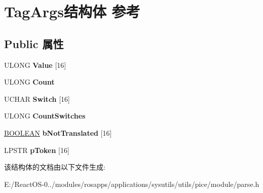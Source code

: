 \hypertarget{struct_tag_args}{}\section{Tag\+Args结构体 参考}
\label{struct_tag_args}
\subsection*{Public 属性}
\begin{DoxyCompactItemize}
\item 
\mbox{\label{struct_tag_args_a6a96226ab4db1710fdfc657845b60a0a}} 
U\+L\+O\+NG {\bfseries Value} \mbox{[}16\mbox{]}
\item 
\mbox{\label{struct_tag_args_ab8f7b4ee7f9e4b93aca412ffead17ae2}} 
U\+L\+O\+NG {\bfseries Count}
\item 
\mbox{\label{struct_tag_args_ac40c03c0475e6979744399dc814af018}} 
U\+C\+H\+AR {\bfseries Switch} \mbox{[}16\mbox{]}
\item 
\mbox{\label{struct_tag_args_a312f6bab5c6b83f950a2fda3466895db}} 
U\+L\+O\+NG {\bfseries Count\+Switches}
\item 
\mbox{\label{struct_tag_args_a5dfe4621f35f90363ecde3baa97c4bce}} 
\hyperlink{_processor_bind_8h_a112e3146cb38b6ee95e64d85842e380a}{B\+O\+O\+L\+E\+AN} {\bfseries b\+Not\+Translated} \mbox{[}16\mbox{]}
\item 
\mbox{\label{struct_tag_args_a999e4ad53c36220df03210362e480c5f}} 
L\+P\+S\+TR {\bfseries p\+Token} \mbox{[}16\mbox{]}
\end{DoxyCompactItemize}


该结构体的文档由以下文件生成\+:\begin{DoxyCompactItemize}
\item 
E\+:/\+React\+O\+S-\/0../modules/rosapps/applications/sysutils/utils/pice/module/parse.\+h\end{DoxyCompactItemize}
